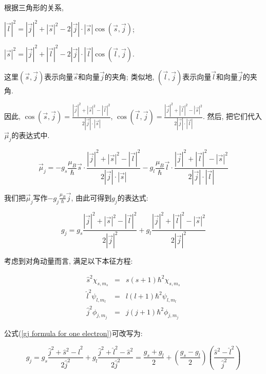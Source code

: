 根据三角形的关系,

\begin{center}
$|\vec l|^2 = |\vec j|^2 + |\vec s|^2 -2|\vec j|\cdot|\vec
s|\cos(\vec s,\vec j)$;

$|\vec s|^2 = |\vec j|^2 + |\vec l|^2 -2|\vec j|\cdot|\vec
l|\cos(\vec l,\vec j)$.
\end{center}

这里$(\vec s, \vec j)$表示向量$\vec s$和向量$\vec j$的夹角; 类似地,
$(\vec l, \vec j)$表示向量$\vec l$和向量$\vec j$的夹角.

因此, $\cos(\vec s,\vec j) = \frac{|\vec j|^2 + |\vec s|^2 - |\vec
l|^2}{2|\vec j|\cdot|\vec s|}$, $\cos(\vec l,\vec j) = \frac{|\vec
j|^2 + |\vec l|^2 - |\vec s|^2}{2|\vec j|\cdot|\vec l|}$. 然后,
把它们代入$\vec \mu_j$的表达式中.

\begin{equation*}
\vec \mu_j = - g_s \frac{\mu_B}{\hbar} \vec s \cdot \frac{|\vec j|^2
+ |\vec s|^2 - |\vec l|^2}{2|\vec j|\cdot|\vec s|}  - g_l
\frac{\mu_B}{\hbar} \vec l \cdot \frac{|\vec j|^2 + |\vec l|^2 -
|\vec s|^2}{2|\vec j|\cdot|\vec l|}
\end{equation*}


我们把$\vec \mu_j$写作$- g_j \frac{\mu_B}{\hbar} \vec j$,
由此可得到$g_j$的表达式:

\begin{equation}\label{gj formula for one electron}
g_j = g_s \frac{|\vec j|^2 + |\vec s|^2 - |\vec l|^2}{2|\vec j|^2} +
g_l \frac{|\vec j|^2 + |\vec l|^2 - |\vec s|^2}{2|\vec j|^2}
\end{equation}

考虑到对角动量而言, 满足以下本征方程:

\begin{eqnarray*}
  \hat s^2 \chi_{s,m_s}  &=& s(s+1)\hbar^2 \chi_{s,m_s}\\
  \hat l^2 \psi_{l,m_l} &=& l(l+1)\hbar^2 \psi_{l,m_l} \\
  \hat j^2 \phi_{j,m_j} &=& j(j+1)\hbar^2 \phi_{j,m_j}
\end{eqnarray*}

公式(\ref{gj formula for one electron})可改写为:

\begin{equation*}
g_j = g_s \frac{\hat j^2 + \hat s^2 - \hat l^2}{2\hat j^2} + g_l
\frac{\hat j^2 + \hat l^2 - \hat s^2}{2\hat j^2} = \frac{g_s +
g_l}{2} + \left(\frac{g_s - g_l}{2} \right)\left(\frac{\hat s^2 -
\hat l^2}{\hat j^2} \right)
\end{equation*}

